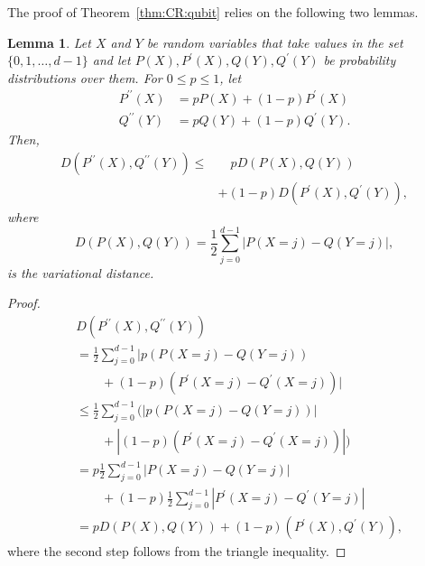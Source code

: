 \documentclass[DIV=calc,paper=a4,fontsize=11pt,twocolumn]{scrartcl} %
\theoremstyle{definition}
\theoremstyle{plain}
\newtheorem{lemma}[definition]{Lemma}
\begin{document}
The proof of Theorem~\ref{thm:CR:qubit} relies on the following two
lemmas.

\begin{lemma}
\label{lem:CR:convex}
Let $X$ and $Y$ be random variables that take values in the set
$\{0,1,\ldots,d-1\}$ and let $P(X), P^{\prime}(X), Q(Y),
Q^{\prime}(Y)$ be probability distributions over them.  For $0 \leq
p \leq 1$, let
\begin{align}
P^{\prime\prime}(X) & = p P(X) + (1-p)P^{\prime}(X) \\
Q^{\prime\prime}(Y) & = p Q(Y) + (1-p)Q^{\prime}(Y).
\end{align}
Then,
\begin{align}
D \left (P^{\prime\prime}(X),Q^{\prime\prime}(Y) \right ) \leq &\quad p D
\left ( P(X),Q(Y) \right ) \nonumber\\
&+ (1-p)D \left (
P^{\prime}(X),Q^{\prime}(Y) \right ),
\end{align}
where
\begin{equation}
D \left ( P(X),Q(Y) \right ) = \frac{1}{2} \sum_{j=0}^{d-1} \left
| P(X=j) - Q(Y=j)\right |,
\end{equation}
is the variational distance.
\end{lemma}
\begin{proof}
  \begin{align}
	& D  ( P^{\prime\prime}(X), Q^{\prime\prime}(Y)  ) \nonumber\\
	& =
    \frac{1}{2} \sum_{j=0}^{d-1}  | p  ( P(X=j) -
        Q(Y=j) ) \nonumber\\
				&\quad\quad+ (1-p)  ( P^{\prime}(X=j) -
        Q^{\prime}(X=j) ) | \\
    & \leq \frac{1}{2} \sum_{j=0}^{d-1}  (  | p  (
          P(X=j) - Q(Y=j) )  | \nonumber\\
					&\quad\quad +  | (1-p)  (
          P^{\prime}(X=j) - Q^{\prime}(X=j) ) |  ) \\
  & = p \frac{1}{2} \sum_{j=0}^{d-1}  | P(X=j) - Q(Y=j) | \nonumber\\
	&\quad\quad +
  (1-p) \frac{1}{2} \sum_{j=0}^{d-1}  | P^{\prime}(X=j) -
    Q^{\prime}(Y=j) |  \\
  & = p D  ( P(X), Q(Y) ) + (1-p)  ( P^{\prime}(X),
    Q^{\prime}(Y) ),
 \end{align}
where the second step follows from the triangle inequality.
\end{proof}
\end{document}

